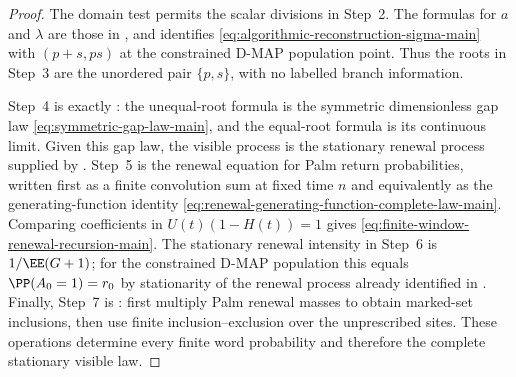 \begin{proof}
The domain test permits the scalar divisions in Step~2.  The formulas for
\(a\) and \(\lambda\) are those in
, and
 identifies
\eqref{eq:algorithmic-reconstruction-sigma-main} with \((p+s,ps)\) at the
constrained D-MAP population point.  Thus the roots in Step~3 are the
unordered pair \(\{p,s\}\), with no labelled branch information.

Step~4 is exactly : the
unequal-root formula is the symmetric dimensionless gap law
\eqref{eq:symmetric-gap-law-main}, and the equal-root formula is its continuous
limit.  Given this gap law, the visible process is the stationary renewal
process supplied by .  Step~5 is the renewal
equation for Palm return probabilities, written first as a finite convolution
sum at fixed time \(n\) and equivalently as the generating-function identity
\eqref{eq:renewal-generating-function-complete-law-main}.  Comparing
coefficients in \(U(t)(1-H(t))=1\) gives
\eqref{eq:finite-window-renewal-recursion-main}.
The stationary renewal intensity in Step~6 is \(1/\EE(G+1)\); for the
constrained D-MAP population this equals
\(\PP(A_0=1)=r_0\) by stationarity of the renewal process already identified
in .  Finally, Step~7 is
: first multiply Palm renewal
masses to obtain marked-set inclusions, then use finite inclusion--exclusion
over the unprescribed sites.  These operations determine every finite word
probability and therefore the complete stationary visible law.
\end{proof}

